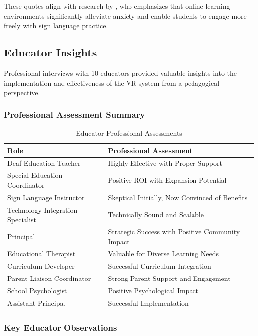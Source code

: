 \documentclass[12pt,a4paper]{article}
\begin{document}
These quotes align with research by \citet{alawajee2021influence}, who emphasizes that online learning environments significantly alleviate anxiety and enable students to engage more freely with sign language practice.

\subsection{Educator Insights}

Professional interviews with 10 educators provided valuable insights into the implementation and effectiveness of the VR system from a pedagogical perspective.

\subsubsection{Professional Assessment Summary}

\begin{table}[H]
\centering
\caption{Educator Professional Assessments}
\begin{tabular}{ll}
\toprule
\textbf{Role} & \textbf{Professional Assessment} \\
\midrule
Deaf Education Teacher & Highly Effective with Proper Support \\
Special Education Coordinator & Positive ROI with Expansion Potential \\
Sign Language Instructor & Skeptical Initially, Now Convinced of Benefits \\
Technology Integration Specialist & Technically Sound and Scalable \\
Principal & Strategic Success with Positive Community Impact \\
Educational Therapist & Valuable for Diverse Learning Needs \\
Curriculum Developer & Successful Curriculum Integration \\
Parent Liaison Coordinator & Strong Parent Support and Engagement \\
School Psychologist & Positive Psychological Impact \\
Assistant Principal & Successful Implementation \\
\bottomrule
\end{tabular}
\end{table}

\subsubsection{Key Educator Observations}
\end{document}
